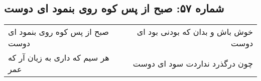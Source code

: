 \begin{center}
\section*{شماره ۵۷: صبح از پس کوه روی بنمود ای دوست}
\label{sec:057}
\begin{longtable}{l p{0.5cm} r}
صبح از پس کوه روی بنمود ای دوست
&&
خوش باش و بدان که بودنی بود ای دوست
\\
هر سیم که داری به زیان آر که عمر
&&
چون درگذرد نداردت سود ای دوست
\\
\end{longtable}
\end{center}

